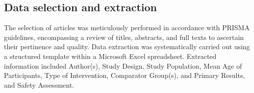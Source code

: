 \subsection{Data selection and extraction}\label{s:data-selection-and-extraction}
The selection of articles was meticulously performed in accordance with PRISMA guidelines, encompassing a review of titles, abstracts, and full texts to ascertain their pertinence and quality. Data extraction was systematically carried out using a structured template within a Microsoft Excel spreadsheet. Extracted information included Author(s), Study Design, Study Population, Mean Age of Participants, Type of Intervention, Comparator Group(s), and Primary Results, and Safety Assessment.

\vfill
\newpage